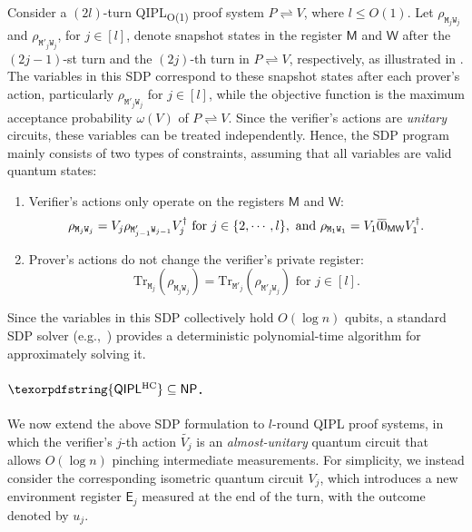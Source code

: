 \documentclass[11pt, a4paper]{article}
\numberwithin{equation}{section}
\numberwithin{figure}{section}
\newcommand{\NP}{\textnormal{\textsf{NP}}\xspace}
\newcommand{\QIPL}{\textnormal{\textsf{QIPL}}\xspace}
\newcommand{\QIPLconst}{\texorpdfstring{\textnormal{\textsf{QIPL}\textsubscript{O(1)}}}\xspace}
\newcommand{\QIPLHC}{\texorpdfstring{\textnormal{\textsf{QIPL}\textsuperscript{\textnormal{HC}}}}\xspace}
\newcommand{\protocol}[2]{{#1}\!\rightleftharpoons\!{#2}}
\let\ket\relax\DeclarePairedDelimiter\ket{\lvert}{\rangle}
\let\bra\relax\DeclarePairedDelimiter\bra{\langle}{\rvert}
\newcommand{\ketbra}[2]{\ensuremath{\ket{#1}\!\bra{#2}}}
\newcommand{\Tr}{\mathrm{Tr}}
\newcommand{\sfE}{\mathsf{E}}
\newcommand{\sfM}{\mathsf{M}}
\newcommand{\sfW}{\mathsf{W}}
\newcommand{\ttM}{\mathtt{M}}
\newcommand{\ttW}{\mathtt{W}}
\begin{document}
Consider a $(2l)$-turn \QIPLconst{} proof system $\protocol{P}{V}$, where $l \leq O(1)$.
Let $\rho_{\ttM_j\ttW_j}$ and $\rho_{\ttM'_j\ttW_j}$, for $j \in [l]$, denote snapshot states in the register $\sfM$ and $\sfW$ after the $(2j-1)$-st turn and the $(2j)$-th turn in $\protocol{P}{V}$, respectively, as illustrated in . The variables in this SDP correspond to these snapshot states after each prover's action, particularly $\rho_{\ttM'_j\ttW_j}$ for $j\in[l]$, while the objective function is the maximum acceptance probability $\omega(V)$ of $\protocol{P}{V}$. 
Since the verifier's actions are \textit{unitary} circuits, these variables can be treated independently. Hence, the SDP program mainly consists of two types of constraints, assuming that all variables are valid quantum states: 
\begin{enumerate}[label={\upshape(\roman*)}, itemsep=0.33em, topsep=0.33em, parsep=0.33em]
    \item Verifier's actions only operate on the registers $\sfM$ and $\sfW$: 
    \[\rho_{\ttM_{j}\ttW_{j}} = V_{j} \rho_{\ttM'_{j-1}\ttW_{j-1}} V_{j}^{\dagger} \text{ for } j\in \{2,\cdots,l\}, \text{ and } \rho_{\ttM_1\ttW_1} = V_1 \ketbra{\bar{0}}{\bar{0}}_{\sfM\sfW}V_1^{\dagger}.\] 
    \item Prover's actions do not change the verifier's private register: 
    \begin{equation}
        \label{eq:QSZKL-constraint}
        \Tr_{\ttM_j}(\rho_{\ttM_j\ttW_j}) = \Tr_{\ttM'_j}(\rho_{\ttM'_j\ttW_j}) \text{ for } j \in [l].
    \end{equation} 
\end{enumerate}
Since the variables in this SDP collectively hold $O(\log{n})$ qubits, a standard SDP solver (e.g.,~\cite{GM12}) provides a deterministic polynomial-time algorithm for approximately solving it. 

\paragraph{$\QIPLHC \subseteq \NP$.} 
We now extend the above SDP formulation to $l$-round \QIPL{} proof systems, in which the verifier's $j$-th action $\widetilde{V_j}$ is an \textit{almost-unitary} quantum circuit that allows $O(\log{n})$ pinching intermediate measurements. For simplicity, we instead consider the corresponding isometric quantum circuit $V_j$, which introduces a new environment register $\sfE_j$ measured at the end of the turn, with the outcome denoted by $u_j$. 
\end{document}
